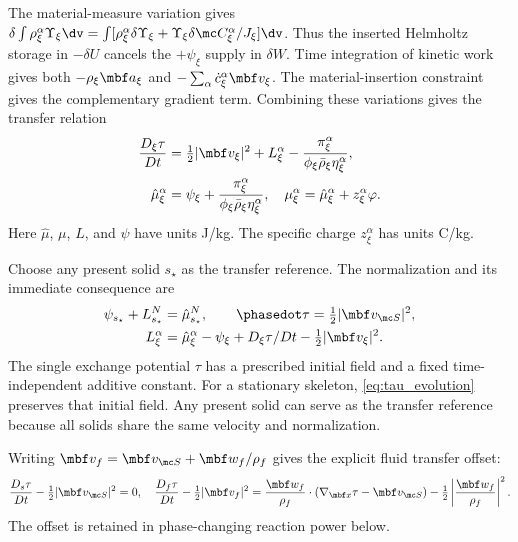 \documentclass[11pt]{article}
\begin{document}
The material-measure variation gives
\(\delta\int\rho_\xi^\alpha\Upsilon_\xi\dv
=\int[\rho_\xi^\alpha\delta\Upsilon_\xi+
\Upsilon_\xi\delta\mc C_\xi^\alpha/J_\xi]\dv\).
Thus the inserted Helmholtz storage in \(-\delta U\) cancels the \(+\psi_\xi\) supply in \(\delta W\). Time integration of kinetic work gives both \(-\rho_\xi\mbf a_\xi\) and \(-\sum_\alpha\dot c_\xi^\alpha\mbf v_\xi\). The material-insertion constraint gives the complementary gradient term. Combining these variations gives the transfer relation
\begin{align}
 \frac{D_\xi\tau}{Dt}&=\tfrac12|\mbf v_\xi|^2+L_\xi^\alpha
 -\frac{\pi_\xi^\alpha}{\phi_\xi\bar\rho_\xi\eta_\xi^\alpha},\label{eq:transfer_variation}\\
 \hat\mu_\xi^\alpha&=\psi_\xi+
 \frac{\pi_\xi^\alpha}{\phi_\xi\bar\rho_\xi\eta_\xi^\alpha},
 \quad \mu_\xi^\alpha=\hat\mu_\xi^\alpha+z_\xi^\alpha\varphi.\label{eq:component_euler}
\end{align}
Here \(\hat\mu\), \(\mu\), \(L\), and \(\psi\) have units J/kg. The specific charge \(z_\xi^\alpha\) has units C/kg.

Choose any present solid \(s_\star\) as the transfer reference. The normalization and its immediate consequence are
\begin{align}
 \psi_{s_\star}+L_{s_\star}^{N}&=\hat\mu_{s_\star}^{N},
 \qquad \phasedot\tau=\tfrac12|\mbf v_{\mc S}|^2,\label{eq:tau_evolution}\\
 L_\xi^\alpha&=\hat\mu_\xi^\alpha-\psi_\xi+
 D_\xi\tau/Dt-\tfrac12|\mbf v_\xi|^2.\label{eq:transfer_recovery}
\end{align}
The single exchange potential \(\tau\) has a prescribed initial field and a fixed time-independent additive constant. For a stationary skeleton, \eqref{eq:tau_evolution} preserves that initial field. Any present solid can serve as the transfer reference because all solids share the same velocity and normalization.

Writing \(\mbf v_f=\mbf v_{\mc S}+\mbf w_f/\rho_f\) gives the explicit fluid transfer offset:
\begin{equation}
 \frac{D_s\tau}{Dt}-\tfrac12|\mbf v_{\mc S}|^2=0,
 \quad \frac{D_f\tau}{Dt}-\tfrac12|\mbf v_f|^2
 =\frac{\mbf w_f}{\rho_f}\cdot(\nabla_{\mbf x}\tau-\mbf v_{\mc S})
 -\tfrac12\left|\frac{\mbf w_f}{\rho_f}\right|^2.
 \label{eq:fluid_transfer_offset}
\end{equation}
The offset is retained in phase-changing reaction power below.
\end{document}
